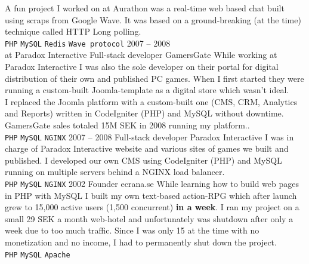 \documentclass[9pt]{template} %
\begin{document}
\begin{entrylist}
{      A fun project I worked on at Aurathon was a real-time web based chat built using scraps from
      Google Wave. It was based on a ground-breaking (at the time) technique called HTTP Long polling.\\
      \texttt{PHP}\slashsep
      \texttt{MySQL}\slashsep
      \texttt{Redis}\slashsep
      \texttt{Wave protocol}
    }
  \entry
    {2007 -- 2008\\\footnotesize{at Paradox Interactive}}
    {Full-stack developer}
    {GamersGate}
    {
      While working at Paradox Interactive I was also the sole developer on their portal for digital
      distribution of their own and published PC games. When I first started they were running a
      custom-built Joomla-template as a digital store which wasn’t ideal.\\

      I replaced the Joomla platform with a custom-built one (CMS, CRM, Analytics and Reports) written
      in CodeIgniter (PHP) and MySQL without downtime.\\

      GamersGate sales totaled 15M SEK in 2008 running my platform..\\
      \texttt{PHP}\slashsep
      \texttt{MySQL}\slashsep
      \texttt{NGINX}
    }
  \entry
    {2007 -- 2008}
    {Full-stack developer}
    {Paradox Interactive}
    {
      I was in charge of Paradox Interactive website and various sites of games we built and published.
      I developed our own CMS using CodeIgniter (PHP) and MySQL running on multiple servers behind a
      NGINX load balancer.\\
      \texttt{PHP}\slashsep
      \texttt{MySQL}\slashsep
      \texttt{NGINX}
    }
  \entry
    {2002}
    {Founder}
    {ecrana.se}
    {
      While learning how to build web pages in PHP with MySQL I built my own text-based action-RPG
      which after launch grew to 15,000 active users (1,500 concurrent) \textbf{in a week}. I ran my
      project on a small 29 SEK a month web-hotel and unfortunately was shutdown after only a week
      due to too much traffic. Since I was only 15 at the time with no monetization and no income,
      I had to permanently shut down the project.\\
      \texttt{PHP}\slashsep
      \texttt{MySQL}\slashsep
      \texttt{Apache}
    }
\end{entrylist}

\pagebreak

\end{document}

